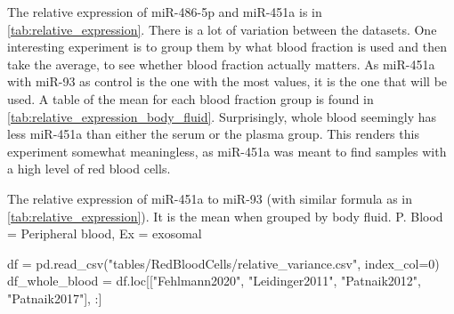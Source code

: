 {{{{{{{{{{{{{{The relative expression of miR-486-5p and miR-451a is in \autoref{tab:relative_expression}. There is a lot of variation between the datasets. One interesting experiment is to group them by what blood fraction is used and then take the average, to see whether blood fraction actually matters. As miR-451a with miR-93 as control is the one with the most values, it is the one that will be used. A table of the mean for each blood fraction group is found in \autoref{tab:relative_expression_body_fluid}. Surprisingly, whole blood seemingly has less miR-451a than either the serum or the plasma group. This renders this experiment somewhat meaningless, as miR-451a was meant to find samples with a high level of red blood cells.

\begin{table}
    \caption{The relative expression of miR-451a to miR-93 (with similar formula as in \autoref{tab:relative_expression}). It is the mean when grouped by body fluid. P. Blood = Peripheral blood, Ex = exosomal}
    \label{tab:relative_expression_body_fluid}
    \begin{center}
    \end{center}
\end{table}

\begin{pycode}
df = pd.read_csv("tables/RedBloodCells/relative_variance.csv", index_col=0)
df_whole_blood = df.loc[["Fehlmann2020", "Leidinger2011", "Patnaik2012", "Patnaik2017"], :]
\end{pycode}

}}}}}}}}}}}}}}

